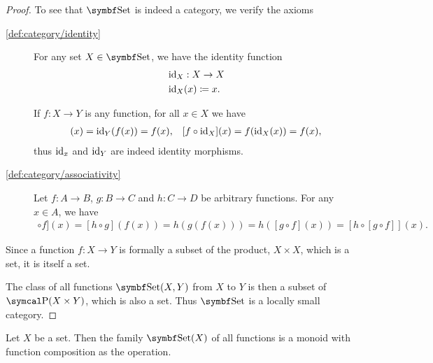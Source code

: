 \begin{proof}
  To see that \( \Cat{Set} \) is indeed a category, we verify the axioms
  \begin{description}
    \item [\ref{def:category/identity}] For any set \( X \in \Cat{Set} \), we have the identity function
    \begin{align*}
      &\operatorname{id}_X: X \to X \\
      &\operatorname{id}_X(x) \coloneqq x.
    \end{align*}

    If \( f: X \to Y \) is any function, for all \( x \in X \) we have
    \begin{align*}
      [\Id_Y \circ f](x) = \Id_Y(f(x)) = f(x),
      &&
      [f \circ \Id_X](x) = f(\Id_X(x)) = f(x),
    \end{align*}
    thus \( \operatorname{id}_x \) and \( \operatorname{id}_Y \) are indeed identity morphisms.

    \item [\ref{def:category/associativity}] Let \( f: A \to B \), \( g: B \to C \) and \( h: C \to D \) be arbitrary functions. For any \( x \in A \), we have
    \begin{align*}
      [[h \circ g] \circ f](x)
      =
      [h \circ g](f(x))
      =
      h(g(f(x)))
      =
      h([g \circ f](x))
      =
      [h \circ [g \circ f]](x).
    \end{align*}
  \end{description}

  Since a function \( f: X \to Y \) is formally a subset of the product, \( X \times X \), which is a set, it is itself a set.

  The class of all functions \( \Cat{Set}(X, Y) \) from \( X \) to \( Y \) is then a subset of \( \Power(X \times Y) \), which is also a set. Thus \( \Bold{Set} \) is a locally small category.
\end{proof}

\begin{corollary}\label{thm:functions_over_set_form_monoid}
  Let \( X \) be a set. Then the family \( \Cat{Set}(X) \) of all functions is a monoid with function composition as the operation.
\end{corollary}

